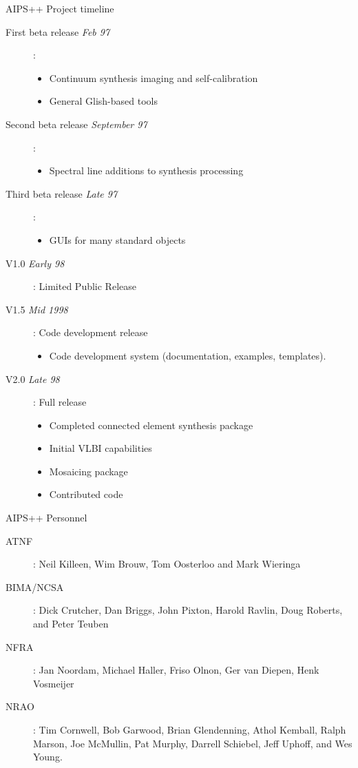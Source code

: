 \begin{slide}{AIPS++ Project timeline}
\begin{description}
\item[First beta release {\em Feb 97}]:
\begin{itemize}
\item Continuum synthesis imaging and self-calibration
\item General Glish-based tools
\end{itemize}
\item[Second beta release {\em September 97}]:
\begin{itemize}
\item Spectral line additions to synthesis processing
\end{itemize}
\item[Third beta release {\em Late 97}]:
\begin{itemize}
\item GUIs for many standard objects
\end{itemize}
\item[V1.0 {\em Early 98}]: Limited Public Release
\item[V1.5 {\em Mid 1998}]: Code development release
\begin{itemize}
\item Code development system (documentation, examples, templates). 
\end{itemize}
\item[V2.0 {\em Late 98}]: Full release
\begin{itemize}
\item Completed connected element synthesis package
\item Initial VLBI capabilities
\item Mosaicing package
\item Contributed code
\end{itemize}
\end{description}
\end{slide}

\begin{slide}{AIPS++ Personnel}
\begin{description}
\item[ATNF]: Neil Killeen, Wim Brouw, Tom Oosterloo and Mark
Wieringa

\item[BIMA/NCSA]: Dick Crutcher, Dan Briggs, John Pixton,
Harold Ravlin, Doug Roberts, and Peter Teuben

\item[NFRA]:  Jan Noordam, Michael Haller, 
Friso Olnon, Ger van Diepen, Henk Vosmeijer

\item[NRAO]: Tim Cornwell, Bob Garwood, Brian
Glendenning, Athol Kemball, Ralph Marson, Joe McMullin, Pat Murphy,
Darrell Schiebel, Jeff Uphoff, and Wes Young.

\end{description}
\end{slide}

